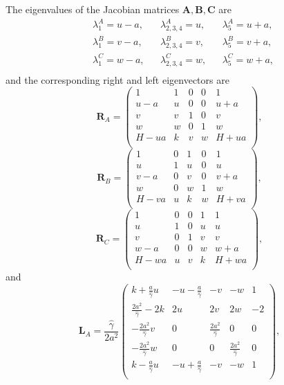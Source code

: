 \documentclass[review]{elsarticle}
\newcommand{\fr}{\frac}
\newcommand{\ga}{\gamma}
\newcommand{\la}{\lambda}
\newcommand{\bA}{\mathbf  A}
\newcommand{\bB}{\mathbf  B}
\newcommand{\bC}{\mathbf  C}
\newcommand{\bL}{\mathbf  L}
\newcommand{\bR}{\mathbf  R}
\begin{document}
The eigenvalues of the Jacobian matrices $\bA, \bB, \bC$ are
\begin{equation}\label{lambda-A}
\left. \begin{split}
  & \la^A_1 = u-a, & & \la^A_{2,3,4} = u, & & \la^A_5 = u+a, \\
  & \la^B_1 = v-a, & & \la^B_{2,3,4} = v, & & \la^B_5 = v+a, \\
  & \la^C_1 = w-a, & & \la^C_{2,3,4} = w, & & \la^C_5 = w+a, \\
\end{split} \right.
\end{equation}
and the corresponding right and left eigenvectors are
\begin{equation}\label{RA-3d}
   \bR_A = \left( \begin{array}{ccccc}
  1 & 1 & 0 & 0& 1 \\
  u-a & u & 0& 0& u+a \\
  v & v & 1 & 0 & v \\
  w & w & 0 & 1 & w\\
  H - ua & k & v & w & H + ua \\
  \end{array} \right),
\end{equation}
\begin{equation}\label{RB-3d}
   \bR_B = \left( \begin{array}{ccccc}
  1 & 0 & 1 & 0 & 1 \\
  u & 1 & u & 0 & u \\
  v-a & 0 & v & 0 & v+a \\
  w & 0 & w & 1 & w \\
  H - va & u & k & w & H + va \\
  \end{array} \right),
\end{equation}
\begin{equation}\label{RC-3d}
   \bR_C = \left( \begin{array}{ccccc}
  1 & 0 & 0 & 1 & 1 \\
  u & 1 & 0 & u & u \\
  v & 0 & 1 & v & v \\
  w-a & 0 & 0 & w & w+a \\
  H - wa & u & v & k & H + wa \\
  \end{array} \right),
\end{equation}
and
\begin{equation}\label{LA-3d}
   \bL_A = \fr{\hat \ga}{2 a^2} \left( \begin{array}{ccccc}
  k + \fr{a}{\hat \ga} u & -u -\fr{a}{\hat \ga} & -v & -w & 1 \\
  \fr{2a^2}{\hat \ga} - 2k & 2u & 2v & 2w & -2 \\
  -\fr{2a^2}{\hat \ga}v & 0 & \fr{2a^2}{\hat \ga} & 0 & 0 \\
  -\fr{2a^2}{\hat \ga}w & 0 & 0 & \fr{2a^2}{\hat \ga} & 0 \\
  k - \fr{a}{\hat \ga} u & -u + \fr{a}{\hat \ga} & -v & -w & 1 \\
  \end{array} \right),
\end{equation}
\end{document}

